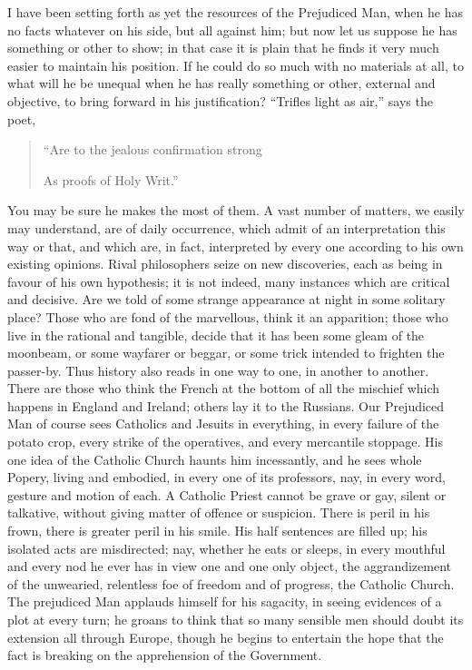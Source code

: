 I have been setting forth as yet the resources of the
Prejudiced Man, when he has no facts whatever on his
side, but all against him; but now let us suppose he has
something or other to show; in that case it is plain that
he finds it very much easier to maintain his position. If
he could do so much with no materials at all, to what
will he be unequal when he has really something or other,
external and objective, to bring forward in his
justification? ``Trifles light as air,'' says the
poet,

\begin{quote}

``Are to the jealous confirmation strong

As proofs of Holy Writ.''

\end{quote}

You may be sure he makes the most of them. A vast
number of matters, we easily may understand, are of daily
occurrence, which admit of an interpretation this way or
that, and which are, in fact, interpreted by every one
according to his own existing opinions. Rival
philosophers seize on new discoveries, each as being in
favour of his own hypothesis; it is not indeed, many
instances which are critical and decisive. Are we told of
some strange appearance at night in some solitary place?
Those who are fond of the marvellous, think it an
apparition; those who live in the rational and tangible,
decide that it has been some gleam of the moonbeam, or
some wayfarer or beggar, or some trick intended to
frighten the passer-by. Thus history also reads in one
way to one, in another to another. There are those who
think the French at the bottom of all the mischief which
happens in England and Ireland; others lay it to the
Russians. Our Prejudiced Man of course sees Catholics and
Jesuits in everything, in every failure of the potato
crop, every strike of the operatives, and every
mercantile stoppage. His one idea of the Catholic Church
haunts him incessantly, and he sees whole Popery, living
and embodied, in every one of its professors, nay, in
every word, gesture and motion of each. A Catholic Priest
cannot be grave or gay, silent or talkative, without
giving matter of offence or suspicion. There is peril in
his frown, there is greater peril in his smile. His half
sentences are filled up; his isolated acts are
misdirected; nay, whether he eats or sleeps, in every
mouthful and every nod he ever has in view one and one
only object, the aggrandizement of the unwearied,
relentless foe of freedom and of progress, the Catholic
Church. The prejudiced Man applauds himself for his
sagacity, in seeing evidences of a plot at every turn; he
groans to think that so many sensible men should doubt
its extension all through Europe, though he begins to
entertain the hope that the fact is breaking on the
apprehension of the Government.

